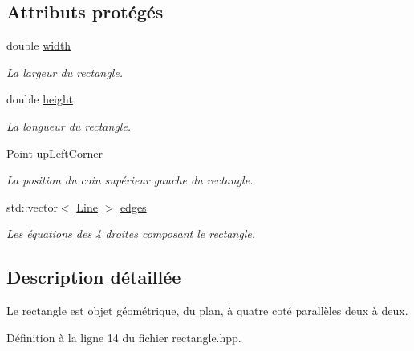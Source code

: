 \subsection*{Attributs protégés}
\begin{DoxyCompactItemize}
\item 
double \hyperlink{classRectangle_ac2c47512ca05c56cec73c32bb693d479}{width}
\begin{DoxyCompactList}\small\item\em La largeur du rectangle. \end{DoxyCompactList}\item 
double \hyperlink{classRectangle_a58c0573f0d706d238759395e8272c6bf}{height}
\begin{DoxyCompactList}\small\item\em La longueur du rectangle. \end{DoxyCompactList}\item 
\hyperlink{classPoint}{Point} \hyperlink{classRectangle_aeeb6ca62aa27e964265c92d1ea25d511}{up\+Left\+Corner}
\begin{DoxyCompactList}\small\item\em La position du coin supérieur gauche du rectangle. \end{DoxyCompactList}\item 
std\+::vector$<$ \hyperlink{classLine}{Line} $>$ \hyperlink{classRectangle_a2c04232970a644df46826a411714966f}{edges}
\begin{DoxyCompactList}\small\item\em Les équations des 4 droites composant le rectangle. \end{DoxyCompactList}\end{DoxyCompactItemize}


\subsection{Description détaillée}
Le rectangle est objet géométrique, du plan, à quatre coté parallèles deux à deux. 

Définition à la ligne 14 du fichier rectangle.\+hpp.



